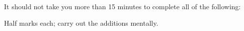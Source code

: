 \begin{exercises}
    It should not take you more than 15 minutes to complete all of the following:
    \begin{questions}
        \Question[6] Half marks each; carry out the additions mentally.
        \begin{multicols}{3}
\end{multicols}
\end{questions}
\end{exercises}
